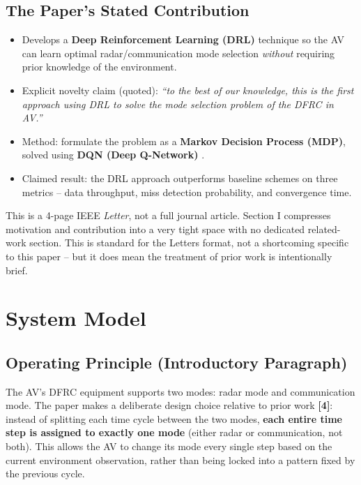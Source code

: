 \documentclass[11pt]{article}
\begin{document}
\subsection{The Paper's Stated Contribution}
\begin{itemize}[leftmargin=1.5em]
    \item Develops a \textbf{Deep Reinforcement Learning (DRL)} technique so the AV can
    learn optimal radar/communication mode selection \emph{without} requiring prior
    knowledge of the environment.
    \item Explicit novelty claim (quoted): \emph{``to the best of our knowledge, this is
    the first approach using DRL to solve the mode selection problem of the DFRC in
    AV.''}
    \item Method: formulate the problem as a \textbf{Markov Decision Process (MDP)},
    solved using \textbf{DQN (Deep Q-Network)} \cite{mnih2015}.
    \item Claimed result: the DRL approach outperforms baseline schemes on three
    metrics -- data throughput, miss detection probability, and convergence time.
\end{itemize}

\begin{remark}
This is a 4-page IEEE \emph{Letter}, not a full journal article. Section I compresses
motivation and contribution into a very tight space with no dedicated related-work
section. This is standard for the Letters format, not a shortcoming specific to this
paper -- but it does mean the treatment of prior work is intentionally brief.
\end{remark}

\section{System Model}

\subsection{Operating Principle (Introductory Paragraph)}
The AV's DFRC equipment supports two modes: radar mode and communication mode. The
paper makes a deliberate design choice relative to prior work \textbf{[4]}: instead of
splitting each time cycle between the two modes, \textbf{each entire time step is
assigned to exactly one mode} (either radar or communication, not both). This allows the
AV to change its mode every single step based on the current environment observation,
rather than being locked into a pattern fixed by the previous cycle.
\end{document}
